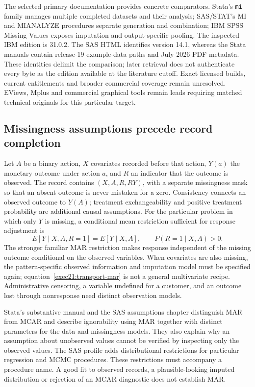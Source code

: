 The selected primary documentation provides concrete comparators. Stata's
\texttt{mi} family manages multiple completed datasets and their analysis;
SAS/STAT's MI and MIANALYZE procedures separate generation and combination;
IBM SPSS Missing Values exposes imputation and output-specific pooling.
The inspected IBM edition is 31.0.2. The SAS HTML identifies version 14.1,
whereas the Stata manuals contain release-19 example-data paths and July 2026
PDF metadata. These identities delimit the comparison; later retrieval does
not authenticate every byte as the edition available at the literature cutoff.
Exact licensed builds, current entitlements and broader commercial coverage
remain unresolved. EViews, Mplus and commercial graphical tools remain leads
requiring matched technical originals for this particular target.
\citep{exec21_transport_stata_mi,exec21_transport_sas_mi_intro,exec21_transport_spss_missing}

\subsection{Missingness assumptions precede record completion}
\label{exec21:transport-missingness}

Let $A$ be a binary action, $X$ covariates recorded before that action, $Y(a)$
the monetary outcome under action $a$, and $R$ an indicator that the outcome is
observed. The record contains $(X,A,R,RY)$, with a separate missingness mask so
that an absent outcome is never mistaken for a zero. Consistency connects an
observed outcome to $Y(A)$; treatment exchangeability and positive treatment
probability are additional causal assumptions. For the particular problem in
which only $Y$ is missing, a conditional mean restriction sufficient for response
adjustment is
\begin{equation}
 E[Y\mid X,A,R=1]=E[Y\mid X,A],\qquad
 P(R=1\mid X,A)>0.
 \label{exec21:transport-mar}
\end{equation}
The stronger familiar MAR restriction makes response independent of the missing
outcome conditional on the observed variables. When covariates are also missing,
the pattern-specific observed information and imputation model must be specified
again; equation~\eqref{exec21:transport-mar} is not a general multivariate recipe.
Administrative censoring, a variable undefined for a customer, and an outcome
lost through nonresponse need distinct observation models.

Stata's substantive manual and the SAS assumptions chapter distinguish MAR
from MCAR and describe ignorability using MAR together with distinct parameters
for the data and missingness models. They also explain why an assumption about
unobserved values cannot be verified by inspecting only the observed values.
The SAS profile adds distributional restrictions for particular regression and
MCMC procedures. These restrictions must accompany a procedure name. A good
fit to observed records, a plausible-looking imputed distribution or rejection
of an MCAR diagnostic does not establish MAR.
\citep{exec21_transport_stata_substantive,exec21_transport_sas_assumptions}

